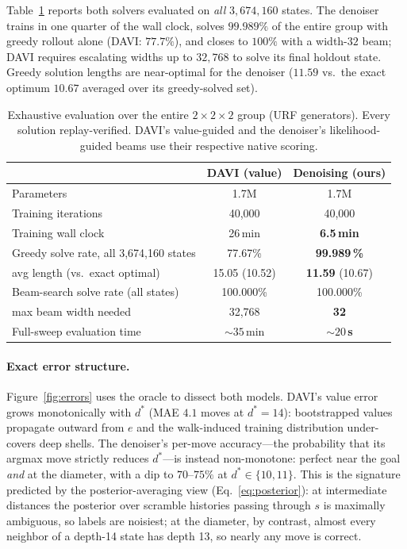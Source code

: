 \documentclass[11pt]{article}
\newcommand{\dstar}{d^{*}}
\begin{document}
Table~\ref{tab:2x2} reports both solvers evaluated on \emph{all}
$3{,}674{,}160$ states. The denoiser trains in one quarter of the wall clock,
solves $99.989\%$ of the entire group with greedy rollout alone (DAVI:
$77.7\%$), and closes to $100\%$ with a width-$32$ beam; DAVI requires
escalating widths up to $32{,}768$ to solve its final holdout state. Greedy
solution lengths are near-optimal for the denoiser ($11.59$ vs.\ the exact
optimum $10.67$ averaged over its greedy-solved set).

\begin{table}[t]
\centering
\small
\begin{tabular}{lcc}
\toprule
& DAVI (value) & Denoising (ours) \\
\midrule
Parameters & 1.7M & 1.7M \\
Training iterations & 40{,}000 & 40{,}000 \\
Training wall clock & 26\,min & \textbf{6.5\,min} \\
Greedy solve rate, all 3{,}674{,}160 states & 77.67\% & \textbf{99.989\,\%} \\
\quad avg length (vs.\ exact optimal) & 15.05 (10.52) & \textbf{11.59} (10.67) \\
Beam-search solve rate (all states) & 100.000\% & 100.000\% \\
\quad max beam width needed & 32{,}768 & \textbf{32} \\
Full-sweep evaluation time & ${\sim}35$\,min & \textbf{${\sim}20$\,s} \\
\bottomrule
\end{tabular}
\caption{Exhaustive evaluation over the entire $2{\times}2{\times}2$ group
(URF generators). Every solution replay-verified. DAVI's value-guided and the
denoiser's likelihood-guided beams use their respective native scoring.}
\label{tab:2x2}
\end{table}

\paragraph{Exact error structure.}
Figure~\ref{fig:errors} uses the oracle to dissect both models. DAVI's value
error grows monotonically with $\dstar$ (MAE $4.1$ moves at $\dstar{=}14$):
bootstrapped values propagate outward from $e$ and the walk-induced training
distribution under-covers deep shells. The denoiser's per-move accuracy---the
probability that its argmax move strictly reduces $\dstar$---is instead
non-monotone: perfect near the goal \emph{and} at the diameter, with a dip to
$70$--$75\%$ at $\dstar\in\{10,11\}$. This is the signature predicted by the
posterior-averaging view (Eq.~\ref{eq:posterior}): at intermediate distances
the posterior over scramble histories passing through $s$ is maximally
ambiguous, so labels are noisiest; at the diameter, by contrast, almost every
neighbor of a depth-14 state has depth 13, so nearly any move is correct.
\end{document}
